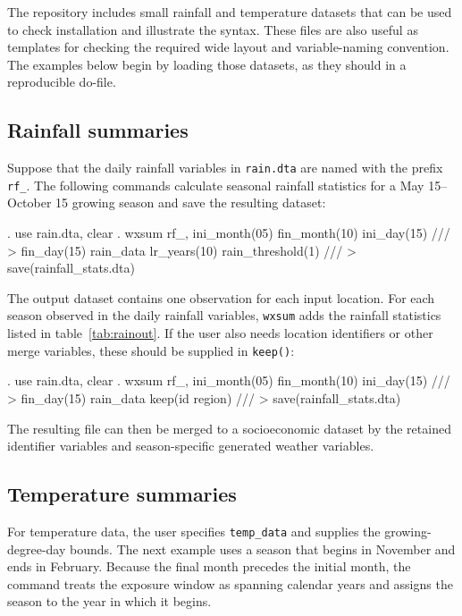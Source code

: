 The repository includes small rainfall and temperature datasets that can be used to check installation and illustrate the syntax. These files are also useful as templates for checking the required wide layout and variable-naming convention. The examples below begin by loading those datasets, as they should in a reproducible do-file.

\subsection{Rainfall summaries}

Suppose that the daily rainfall variables in \texttt{rain.dta} are named with the prefix \texttt{rf\_}. The following commands calculate seasonal rainfall statistics for a May 15--October 15 growing season and save the resulting dataset:

\begin{stlog}
. use rain.dta, clear
. wxsum rf_, ini_month(05) fin_month(10) ini_day(15) ///
>     fin_day(15) rain_data lr_years(10) rain_threshold(1) ///
>     save(rainfall_stats.dta)
\end{stlog}

The output dataset contains one observation for each input location. For each season observed in the daily rainfall variables, \texttt{wxsum} adds the rainfall statistics listed in table~\ref{tab:rainout}. If the user also needs location identifiers or other merge variables, these should be supplied in \texttt{keep()}:

\begin{stlog}
. use rain.dta, clear
. wxsum rf_, ini_month(05) fin_month(10) ini_day(15) ///
>     fin_day(15) rain_data keep(id region) ///
>     save(rainfall_stats.dta)
\end{stlog}

The resulting file can then be merged to a socioeconomic dataset by the retained identifier variables and season-specific generated weather variables.

\subsection{Temperature summaries}

For temperature data, the user specifies \texttt{temp\_data} and supplies the growing-degree-day bounds. The next example uses a season that begins in November and ends in February. Because the final month precedes the initial month, the command treats the exposure window as spanning calendar years and assigns the season to the year in which it begins.

